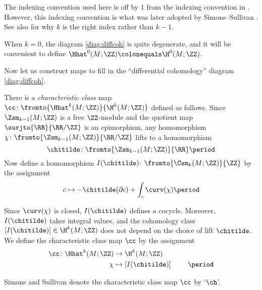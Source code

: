 \begin{warning}
	The indexing convention used here is off by $ 1 $ from the indexing convention in \cite[\S1]{MR827262}.
	However, this indexing convention is what was later adopted by Simons--Sullivan \cite[\S1]{MR2365651}.
	See also  for why $ k $ is the right index rather than $ k - 1 $.
\end{warning}

\begin{remark}
	When $ k = 0 $, the diagram \eqref{diag:diffcoh} is quite degenerate, and it will be convenient to define $ \Hhat^0(M;\ZZ) \colonequals \H^0(M;\ZZ) $.
\end{remark}

Now let us construct maps to fill in the ``differential cohomology'' diagram \eqref{diag:diffcoh}.

\begin{construction}\label{cons:charclassmap}
	There is a \emph{characteristic class} map $ \cc \colon \fromto{\Hhat^k(M;\ZZ)}{\H^k(M;\ZZ)} $ defined as follows.
	Since $ \Zsm_{k-1}(M;\ZZ) $ is a free $ \ZZ $-module and the quotient map $ \surjto{\RR}{\RR/\ZZ} $ is an epimorphism, any homomorphism $ \chi \colon \fromto{\Zsm_{k-1}(M;\ZZ)}{\RR/\ZZ} $ lifts to a homomorphism
	\begin{equation*}
		\chitilde \colon \fromto{\Zsm_{k-1}(M;\ZZ)}{\RR} \period
	\end{equation*}
	Now define a homomorphism $ I(\chitilde) \colon \fromto{\Csm_k(M;\ZZ)}{\ZZ} $ by the assignment
	\begin{equation*}
		c \mapsto - \chitilde(\partial c) + \int_{c} \curv(\chi)  \period
	\end{equation*}

	Since $ \curv(\chi) $ is closed, $ I(\chitilde) $ defines a cocycle.
	Moreover, $ I(\chitilde) $ takes integral values, and the cohomology class $ [I(\chitilde)] \in \H^k(M;\ZZ) $ does not depend on the choice of lift $ \chitilde $.
	We define the characteristic class map $ \cc $ by the assignment
	\begin{align*}
		\cc \colon \Hhat^k(M;\ZZ) &\to \H^k(M;\ZZ) \\
		\chi &\mapsto [I(\chitilde)] \phantom{;\ZZ)} \period
	\end{align*} 
\end{construction}

\begin{warning}
	Simons and Sullivan \cite{MR2365651} denote the characteristic class map $ \cc $ by `$ \ch $'.
\end{warning}


